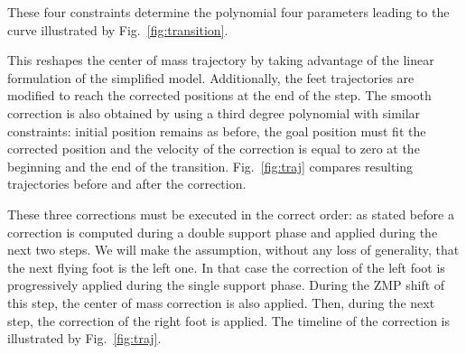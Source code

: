 These four constraints determine the polynomial four parameters
leading to the curve illustrated by Fig.~\ref{fig:transition}.


This reshapes the center of mass trajectory by taking advantage of the
linear formulation of the simplified model. Additionally, the feet
trajectories are modified to reach the corrected positions at the end
of the step. The smooth correction is also obtained by using a third
degree polynomial with similar constraints: initial position remains
as before, the goal position must fit the corrected position and the
velocity of the correction is equal to zero at the beginning and the
end of the transition. Fig.~\ref{fig:traj} compares resulting
trajectories before and after the correction.


These three corrections must be executed in the correct order: as
stated before a correction is computed during a double support phase
and applied during the next two steps. We will make the assumption,
without any loss of generality, that the next flying foot is the left
one. In that case the correction of the left foot is progressively
applied during the single support phase. During the ZMP shift of this
step, the center of mass correction is also applied. Then, during the
next step, the correction of the right foot is applied. The timeline
of the correction is illustrated by Fig.~\ref{fig:traj}.



